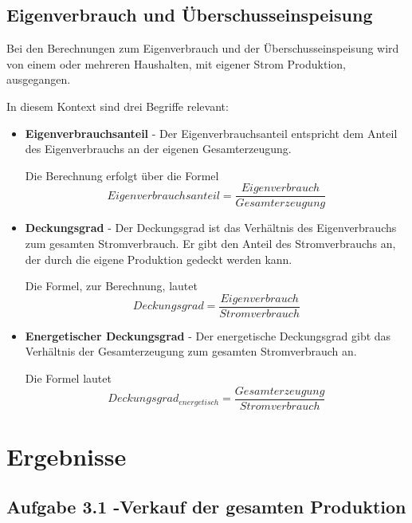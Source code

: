 \documentclass[a4paper,12pt]{article}
\begin{document}
	\subsection{Eigenverbrauch und Überschusseinspeisung}
	\label{sec:eigenverbrauchueberschusseinspeisung}
	Bei den Berechnungen zum Eigenverbrauch und der Überschusseinspeisung wird von einem oder mehreren Haushalten, mit eigener Strom Produktion, ausgegangen.\\ \par
	In diesem Kontext sind drei Begriffe relevant:
	\begin{itemize}
		\item \textbf{Eigenverbrauchsanteil} - Der Eigenverbrauchsanteil entspricht dem Anteil des Eigenverbrauchs an der eigenen Gesamterzeugung.\\ \par
		\noindent Die Berechnung erfolgt über die Formel
		\begin{equation}
		Eigenverbrauchsanteil=\frac{Eigenverbrauch}{Gesamterzeugung}
		\end{equation}
		\item \textbf{Deckungsgrad} - Der Deckungsgrad ist das Verhältnis des Eigenverbrauchs zum gesamten Stromverbrauch.
		Er gibt den Anteil des Stromverbrauchs an, der durch die eigene Produktion gedeckt werden kann.\\ \par
		\noindent Die Formel, zur Berechnung, lautet
		\begin{equation}
		Deckungsgrad=\frac{Eigenverbrauch}{Stromverbrauch}
		\end{equation}
		\item \textbf{Energetischer Deckungsgrad} - Der energetische Deckungsgrad gibt das Verhältnis der Gesamterzeugung zum gesamten Stromverbrauch an.\\ \par
		\noindent Die Formel lautet
		\begin{equation}
		Deckungsgrad_{energetisch}=\frac{Gesamterzeugung}{Stromverbrauch}
		\end{equation}
	\end{itemize}
	\newpage
	\section{Ergebnisse}
	\subsection{Aufgabe 3.1 -Verkauf der gesamten Produktion}
\end{document}
